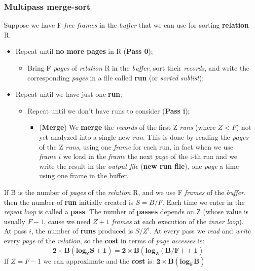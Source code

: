 \documentclass{article}
\begin{document}
\subsubsection{Multipass merge-sort}
Suppose we have F \emph{free frames} in the \emph{buffer} that we can use for sorting \textbf{relation} R.
\begin{itemize}
\item Repeat until \textbf{no more pages} in R (\textbf{Pass 0});
\begin{itemize}
\item Bring F \emph{pages} of \emph{relation} R in the \emph{buffer}, sort their \emph{records}, and write the corresponding \emph{pages} in a file called \textbf{run} (or \emph{sorted sublist});
\end{itemize}
\item Repeat until we have just one \textbf{run};
\begin{itemize} 
\item Repeat until we don't have runs to consider (\textbf{Pass i});
\begin{itemize}
\item (\textbf{Merge}) We \textbf{merge} the \emph{records} of the first Z \emph{runs} (where $Z < F$) not yet analyzed into a single new \emph{run}. This is done by reading the \emph{pages} of the Z \emph{runs}, using one \emph{frame} for each run, in fact when we use \emph{frame} $i$ we load in the \emph{frame} the next \emph{page} of the i-th run and we write the result in the \emph{output file} (\textbf{new run file}), one \emph{page} a time using one frame in the buffer. 
\end{itemize}
\end{itemize}
\end{itemize}
If B is the number of \emph{pages} of the \emph{relation} R, and we use F \emph{frames} of the \emph{buffer}, then the number of \textbf{run} initially created is $S = B/F$. Each time we enter in the\emph{ repeat loop} is called a \textbf{pass}. The number of \textbf{passes} depends on Z (whose value is usually $F-1$, cause we need $Z+1$ \emph{frames} at each execution of the \emph{inner loop}). At pass $i$, the number of \textbf{runs} produced is $S/Z^i$. At every pass we \emph{read} and \emph{write} every \emph{page} of the \emph{relation}, so the \textbf{cost} in terms of\emph{ page accesses} is:
\[\mathbf{2 \times B(log_ZS +1) = 2 \times B(log_Z(B/F)+1)}\]
If $Z=F-1$ we can approximate and the \textbf{cost} is: $\mathbf{2 \times B(log_FB)}$
\end{document}
